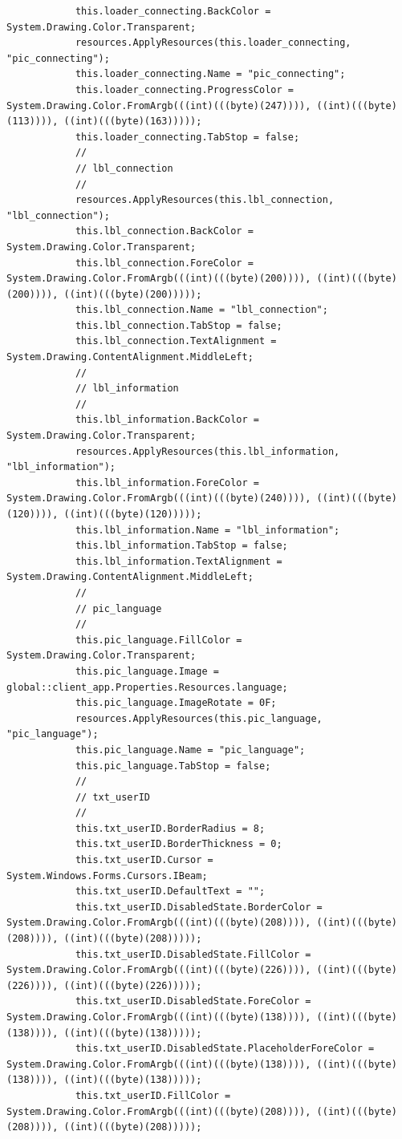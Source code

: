 \documentclass{article}
\begin{document}
\begin{verbatim}
			this.loader_connecting.BackColor = System.Drawing.Color.Transparent;
			resources.ApplyResources(this.loader_connecting, "pic_connecting");
			this.loader_connecting.Name = "pic_connecting";
			this.loader_connecting.ProgressColor = System.Drawing.Color.FromArgb(((int)(((byte)(247)))), ((int)(((byte)(113)))), ((int)(((byte)(163)))));
			this.loader_connecting.TabStop = false;
			// 
			// lbl_connection
			// 
			resources.ApplyResources(this.lbl_connection, "lbl_connection");
			this.lbl_connection.BackColor = System.Drawing.Color.Transparent;
			this.lbl_connection.ForeColor = System.Drawing.Color.FromArgb(((int)(((byte)(200)))), ((int)(((byte)(200)))), ((int)(((byte)(200)))));
			this.lbl_connection.Name = "lbl_connection";
			this.lbl_connection.TabStop = false;
			this.lbl_connection.TextAlignment = System.Drawing.ContentAlignment.MiddleLeft;
			// 
			// lbl_information
			// 
			this.lbl_information.BackColor = System.Drawing.Color.Transparent;
			resources.ApplyResources(this.lbl_information, "lbl_information");
			this.lbl_information.ForeColor = System.Drawing.Color.FromArgb(((int)(((byte)(240)))), ((int)(((byte)(120)))), ((int)(((byte)(120)))));
			this.lbl_information.Name = "lbl_information";
			this.lbl_information.TabStop = false;
			this.lbl_information.TextAlignment = System.Drawing.ContentAlignment.MiddleLeft;
			// 
			// pic_language
			// 
			this.pic_language.FillColor = System.Drawing.Color.Transparent;
			this.pic_language.Image = global::client_app.Properties.Resources.language;
			this.pic_language.ImageRotate = 0F;
			resources.ApplyResources(this.pic_language, "pic_language");
			this.pic_language.Name = "pic_language";
			this.pic_language.TabStop = false;
			// 
			// txt_userID
			// 
			this.txt_userID.BorderRadius = 8;
			this.txt_userID.BorderThickness = 0;
			this.txt_userID.Cursor = System.Windows.Forms.Cursors.IBeam;
			this.txt_userID.DefaultText = "";
			this.txt_userID.DisabledState.BorderColor = System.Drawing.Color.FromArgb(((int)(((byte)(208)))), ((int)(((byte)(208)))), ((int)(((byte)(208)))));
			this.txt_userID.DisabledState.FillColor = System.Drawing.Color.FromArgb(((int)(((byte)(226)))), ((int)(((byte)(226)))), ((int)(((byte)(226)))));
			this.txt_userID.DisabledState.ForeColor = System.Drawing.Color.FromArgb(((int)(((byte)(138)))), ((int)(((byte)(138)))), ((int)(((byte)(138)))));
			this.txt_userID.DisabledState.PlaceholderForeColor = System.Drawing.Color.FromArgb(((int)(((byte)(138)))), ((int)(((byte)(138)))), ((int)(((byte)(138)))));
			this.txt_userID.FillColor = System.Drawing.Color.FromArgb(((int)(((byte)(208)))), ((int)(((byte)(208)))), ((int)(((byte)(208)))));

\end{verbatim}
\end{document}
